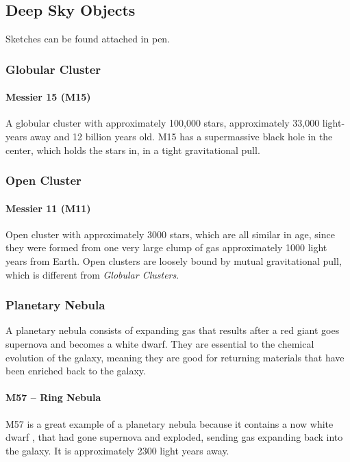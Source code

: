 \documentclass{article}
\begin{document}
\subsection{Deep Sky Objects}
Sketches can be found attached in pen.
\subsubsection{Globular Cluster}
\paragraph{Messier 15 (M15)}
A globular cluster with approximately 100,000 stars, approximately 33,000 light-years away and 12 billion years old.  M15 has a supermassive black hole in the center, which holds the stars in, in a tight gravitational pull.
\subsubsection{Open Cluster}
\paragraph{Messier 11 (M11)}
Open cluster with approximately 3000 stars, which are all similar in age, since they were formed from one very large clump of gas approximately 1000 light years from Earth.  Open clusters are loosely bound by mutual gravitational pull, which is different from \emph{Globular Clusters}.
\subsubsection{Planetary Nebula}
A planetary nebula consists of expanding gas that results after a red giant goes supernova and becomes a white dwarf.  They are essential to the chemical evolution of the galaxy, meaning they are good for returning materials that have been enriched back to the galaxy.
\paragraph{M57 -- Ring Nebula}
M57 is a great example of a planetary nebula because it contains a now white dwarf , that had gone supernova and exploded, sending gas expanding back into the galaxy.  It is approximately 2300 light years away.\cite{ringnebula}    



\end{document}
